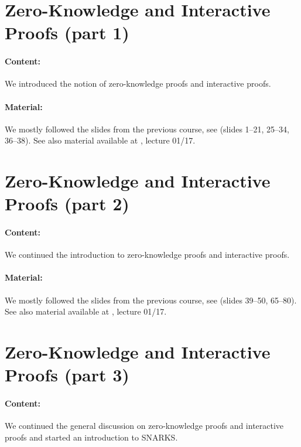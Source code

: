 \documentclass{llncs}
\begin{document}
\section{Zero-Knowledge and Interactive Proofs (part 1)}

\paragraph{Content:} We introduced the notion of zero-knowledge proofs and interactive proofs.

\paragraph{Material:}   We mostly followed the slides from the previous course, see \cite{ZK} (slides 1--21, 25--34, 36--38). See also material available at \cite{ZKlearning}, lecture 01/17.


\section{Zero-Knowledge and Interactive Proofs (part 2)}

\paragraph{Content:}
We continued the introduction to zero-knowledge proofs and interactive proofs.

\paragraph{Material:} We mostly followed the slides from the previous course, see \cite{ZK}  (slides 39--50, 65--80). See also material available at \cite{ZKlearning}, lecture 01/17.





\section{Zero-Knowledge and Interactive Proofs (part 3)}

\paragraph{Content:}
We continued the general discussion on zero-knowledge proofs and interactive proofs and started an introduction to SNARKS.
\end{document}
